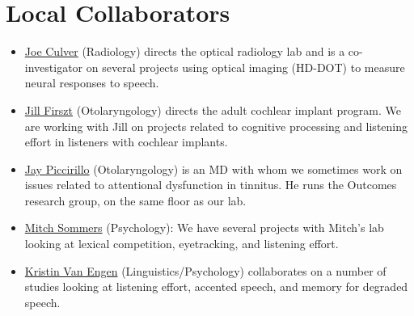 \documentclass[letterpaper,12pt,oneside]{memoir}
\begin{document}
\section{Local Collaborators}
\begin{itemize}
\item{\href{http://orl.wustl.edu/culver.html}{Joe Culver} (Radiology) directs the optical radiology lab and is a co-investigator on several projects using optical imaging (HD-DOT) to measure neural responses to speech.}
\item{\href{http://otocore.wustl.edu/firsztlab/Home.aspx}{Jill Firszt} (Otolaryngology) directs the adult cochlear implant program. We are working with Jill on projects related to cognitive processing and listening effort in listeners with cochlear implants.}
\item{\href{http://otooutcomes.wustl.edu}{Jay Piccirillo} (Otolaryngology) is an MD with whom we sometimes work on issues related to attentional dysfunction in tinnitus. He runs the Outcomes research group, on the same floor as our lab.}
\item{\href{http://psychweb.wustl.edu/sommers}{Mitch Sommers} (Psychology): We have several projects with Mitch's lab looking at lexical competition, eyetracking, and listening effort.}
\item{\href{http://kristinvanengen.wordpress.com}{Kristin Van Engen} (Linguistics/Psychology) collaborates on a number of studies looking at listening effort, accented speech, and memory for degraded speech.}
\end{itemize}
\end{document}
